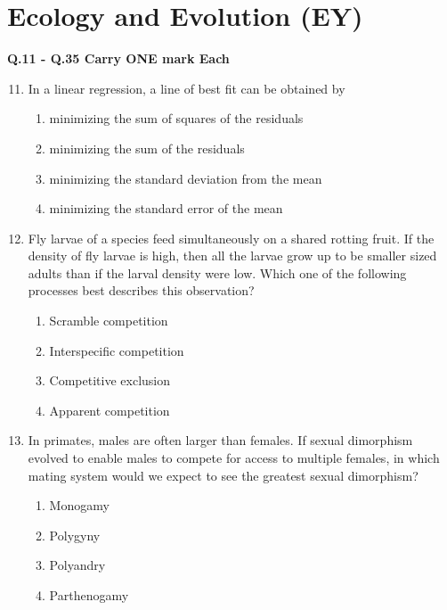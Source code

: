 \documentclass[journal]{IEEEtran}
\begin{document}
\section*{\textbf{Ecology and Evolution (EY)}}
\textbf{Q.11 - Q.35 Carry ONE mark Each}
\begin{enumerate}
\setcounter{enumi}{10}
    \item In a linear regression, a line of best fit can be obtained by
    \begin{enumerate}
        \item minimizing the sum of squares of the residuals
      
  \item minimizing the sum of the residuals
        \item minimizing the standard deviation from the mean
        \item minimizing the standard error of the mean
    \end{enumerate}

    \item Fly larvae of a species feed simultaneously on a shared rotting fruit.
If the density of fly larvae is high, then all the larvae grow up to be smaller sized adults than if the larval density were low.
Which one of the following processes best describes this observation?
\begin{multicols}{2}
    \begin{enumerate}
        \item Scramble competition
        \item Interspecific competition
        \item Competitive exclusion
        \item Apparent competition
    \end{enumerate}
    \end{multicols}
    
    \item In primates, males are often larger than females.
If sexual dimorphism evolved to enable males to compete for access to multiple females, in which mating system would we expect to see the greatest sexual dimorphism?
\begin{multicols}{2}
    \begin{enumerate}
        \item Monogamy
        \item Polygyny
        \item Polyandry
        \item Parthenogamy
    \end{enumerate}
    \end{multicols}


\end{enumerate}
\end{document}
